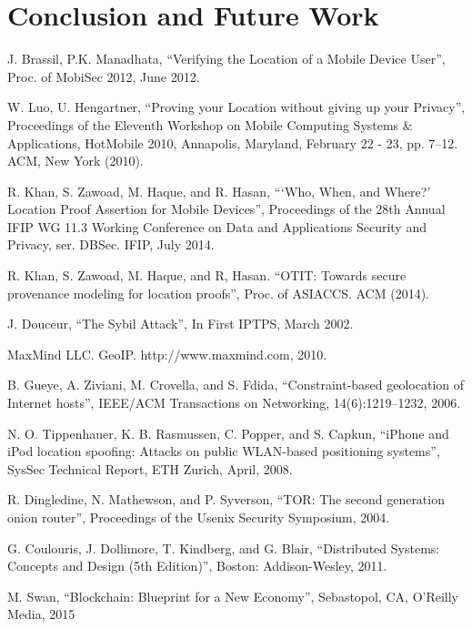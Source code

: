 \documentclass[12pt]{report}
\begin{document}
\chapter{Conclusion and Future Work} \label{ch:conclusion}


\newpage
\begin{thebibliography}{9}

  J. Brassil, P.K. Manadhata,
  ``Verifying the Location of a Mobile Device User'',
  Proc. of MobiSec 2012,
  June 2012.

  W. Luo, U. Hengartner,
  ``Proving your Location without giving up your Privacy'',
  Proceedings of the Eleventh Workshop on Mobile Computing Systems \& Applications,
  HotMobile 2010, Annapolis, Maryland, February 22 - 23, pp. 7–12. ACM,
  New York (2010).

  R. Khan, S. Zawoad, M. Haque, and R. Hasan,
  ```Who, When, and Where?' Location Proof Assertion for Mobile Devices'',
  Proceedings of the 28th Annual IFIP WG 11.3 Working Conference on Data and Applications Security and Privacy, ser. DBSec. IFIP,
  July 2014.
 
  R. Khan, S. Zawoad, M. Haque, and R, Hasan.
  ``OTIT: Towards secure provenance modeling for location proofs'',
  Proc. of ASIACCS. ACM (2014).

  J. Douceur,
  ``The Sybil Attack'',
  In First IPTPS,
  March 2002.

  MaxMind LLC. GeoIP. http://www.maxmind.com,
  2010.

  B. Gueye, A. Ziviani, M. Crovella, and S. Fdida,
  ``Constraint-based geolocation of Internet hosts'',
  IEEE/ACM Transactions on Networking,
  14(6):1219–1232, 2006.

  N. O. Tippenhauer, K. B. Rasmussen, C. Popper, and S. Capkun,
  ``iPhone and iPod location spoofing: Attacks on public WLAN-based positioning systems'',
  SysSec Technical Report,
  ETH Zurich, April, 2008.

  R. Dingledine, N. Mathewson, and P. Syverson,
  ``TOR: The second generation onion router'',
  Proceedings of the Usenix Security Symposium,
  2004.

  G. Coulouris, J. Dollimore, T. Kindberg, and G. Blair,
  ``Distributed Systems: Concepts and Design (5th Edition)'',
  Boston: Addison-Wesley,
  2011.

  M. Swan,
  ``Blockchain: Blueprint for a New Economy'',
  Sebastopol, CA,
  O’Reilly Media, 2015


\end{thebibliography}
\end{document}
